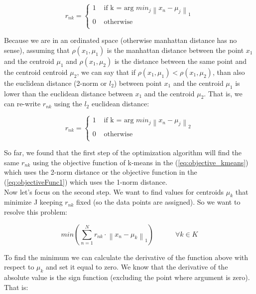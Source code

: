 \documentclass{article}
\newcommand{\norm}[1]{\left\lVert#1\right\rVert}
\begin{document}
\begin{equation} \label{eq:rnk_norm1}
r_{nk} = 
\begin{cases}
	1 & \text{ if k = arg $min_{j}  \norm{x_{n} - \mu_{j}}_{1}  $} \\
	0 & \text{ otherwise } \\
\end{cases}
\end{equation}


Because we are in an ordinated space (otherwise manhattan distance has no sense), assuming that $\rho(x_{1}, \mu_{1})$ is the manhattan distance between the point $x_{1}$ and the centroid $\mu_{1}$ and
$\rho(x_{1}, \mu_{2})$ is the distance between the same point and the centroid centroid $\mu_{2}$, we can say that if $\rho(x_{1}, \mu_{1}) < \rho(x_{1}, \mu_{2})$, than also the euclidean distance (2-norm or $l_{2}$) between 
point $x_{1}$ and the centroid $\mu_{1}$ is lower than the euclidean distance between $x_{1}$ and the centroid $\mu_{2}$. That is, we can re-write $r_{nk}$ using the $l_{2}$ euclidean distance:

\begin{equation} \label{eq:rnk_norm1}
r_{nk} = 
\begin{cases}
	1 & \text{ if k = arg $min_{j}  \norm{x_{n} - \mu_{j}}_{2}  $} \\
	0 & \text{ otherwise } \\
\end{cases}
\end{equation}

So far, we found that the first step of the optimization algorithm will find the same $r_{nk}$ using the objective function of k-means in the (\ref{eq:objective_kmeans}) which uses the 2-norm distance or the objective function in the (\ref{eq:objectiveFunc1}) which uses the 1-norm distance.\\

Now let's focus on the second step. We want to find values for centroids $\mu_{k}$ that minimize J keeping $r_{nk}$ fixed (so the data points are assigned). 
So we want to resolve this problem:

\begin{equation} \label{eq:objectiveFunc3}
min( \sum_{n=1}^{N} r_{nk} \cdot  \norm { x_{n} - \mu_{k} }_{1})      \;\;\;\;\;\;\;\;\;\;\;      \forall k \in K
\end{equation}

To find the minimum we can calculate the derivative of the function above with respect to $\mu_{k}$ and set it equal to zero. We know that the derivative of the absolute value is the sign function (excluding the point where argument is zero). 
That is:
\end{document}
